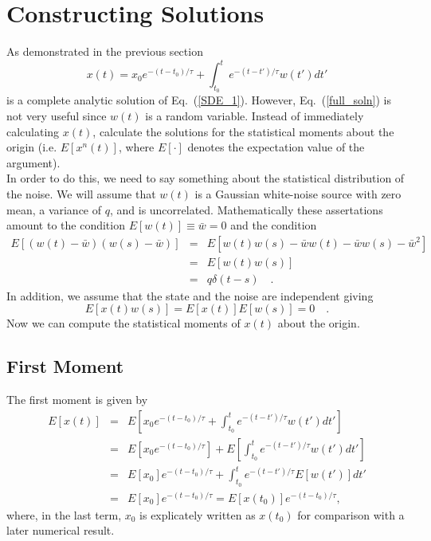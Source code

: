 \documentclass[10pt]{article}
\begin{document}
\section{Constructing Solutions}

As demonstrated in the previous section
\begin{equation}\label{full_soln}
   x(t) = x_{0} e^{ -(t-t_{0})/\tau } + \int_{t_{0}}^{t} e^{ -(t-t')/\tau } w(t') dt'
\end{equation}
is a complete analytic solution of Eq.\ (\ref{SDE_1}).  However, Eq.\ (\ref{full_soln}) is not very useful since
$w(t)$ is a random variable.  Instead of immediately calculating $x(t)$, calculate the solutions for the statistical
moments about the origin (i.e. $E[x^n(t)]$, where $E[\cdot]$ denotes the expectation value of the argument).
\\


In order to do this, we need to say something about the statistical distribution of the noise.  We
will assume that $w(t)$ is a Gaussian white-noise source with zero mean, a variance of $q$, and is uncorrelated.  
Mathematically these assertations amount to the condition $E[w(t)] \equiv {\bar w} = 0$ and the condition
\begin{eqnarray}\label{Gaussian_auto_corr}
  E[(w(t)-{\bar w}) (w(s) - {\bar w}) ] & = & E[ w(t)w(s) - {\bar w} w(t) - {\bar w} w(s) - {\bar w}^2 ] \nonumber \\
                                        & = & E[ w(t)w(s) ] \nonumber \\
										& = & q \delta(t-s) \quad .
\end{eqnarray}
In addition, we assume that the state and the noise are independent giving
\begin{equation}\label{state_noise_expect}
  E[x(t) w(s) ] = E[x(t)] E[w(s)] = 0 \quad .
\end{equation}
Now we can compute the statistical moments of $x(t)$ about the origin.

\subsection{First Moment}

The first moment is given by
\begin{eqnarray}\label{first_moment}
  E[x(t)] & = & E \left[ x_{0} e^{ -(t-t_{0})/\tau } + \int_{t_{0}}^{t} e^{ -(t-t')/\tau } w(t') dt' \right] \nonumber \\
          & = & E \left[ x_{0} e^{ -(t-t_{0})/\tau } \right] + E \left[ \int_{t_{0}}^{t} e^{ -(t-t')/\tau } w(t') dt' \right] \nonumber \\
	      & = & E \left[ x_{0} \right] e^{ -(t-t_{0})/\tau } + \int_{t_{0}}^{t} e^{ -(t-t')/\tau } E \left[ w(t') \right] dt' \nonumber \\
	      & = & E \left[ x_{0} \right] e^{ -(t-t_{0})/\tau } = E \left[ x(t_0) \right] e^{ -(t-t_{0})/\tau } ,
\end{eqnarray}
where, in the last term, $x_{0}$ is explicately written as $x(t_0)$ for comparison with a later numerical result.
\end{document}

